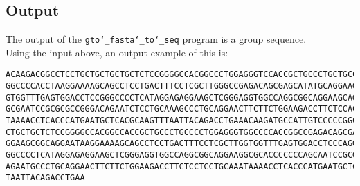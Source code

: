 \subsection*{Output}

The output of the \texttt{gto\char`_fasta\char`_to\char`_seq} program is a group sequence. \\
Using the input above, an output example of this is:
\begin{lstlisting}
ACAAGACGGCCTCCTGCTGCTGCTGCTCTCCGGGGCCACGGCCCTGGAGGGTCCACCGCTGCCCTGCTGCCATTGTCCCC
GGCCCCACCTAAGGAAAAGCAGCCTCCTGACTTTCCTCGCTTGGGCCGAGACAGCGAGCATATGCAGGAAGCGGCAGGAA
GTGGTTTGAGTGGACCTCCGGGCCCCTCATAGGAGAGGAAGCTCGGGAGGTGGCCAGGCGGCAGGAAGCAGGCCAGTGCC
GCGAATCCGCGCGCCGGGACAGAATCTCCTGCAAAGCCCTGCAGGAACTTCTTCTGGAAGACCTTCTCCACCCCCCCAGC
TAAAACCTCACCCATGAATGCTCACGCAAGTTTAATTACAGACCTGAAACAAGATGCCATTGTCCCCCGGCCTCCTGCTG
CTGCTGCTCTCCGGGGCCACGGCCACCGCTGCCCTGCCCCTGGAGGGTGGCCCCACCGGCCGAGACAGCGAGCATATGCA
GGAAGCGGCAGGAATAAGGAAAAGCAGCCTCCTGACTTTCCTCGCTTGGTGGTTTGAGTGGACCTCCCAGGCCAGTGCCG
GGCCCCTCATAGGAGAGGAAGCTCGGGAGGTGGCCAGGCGGCAGGAAGGCGCACCCCCCCAGCAATCCGCGCGCCGGGAC
AGAATGCCCTGCAGGAACTTCTTCTGGAAGACCTTCTCCTCCTGCAAATAAAACCTCACCCATGAATGCTCACGCAAGTT
TAATTACAGACCTGAA
\end{lstlisting}
